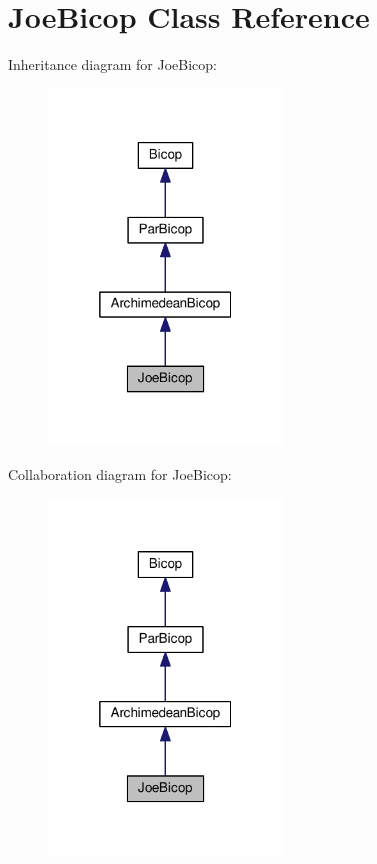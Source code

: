 \hypertarget{class_joe_bicop}{\section{Joe\+Bicop Class Reference}
\label{class_joe_bicop}
}


Inheritance diagram for Joe\+Bicop\+:
\nopagebreak
\begin{figure}[H]
\begin{center}
\leavevmode
\includegraphics[width=176pt]{class_joe_bicop__inherit__graph}
\end{center}
\end{figure}


Collaboration diagram for Joe\+Bicop\+:
\nopagebreak
\begin{figure}[H]
\begin{center}
\leavevmode
\includegraphics[width=176pt]{class_joe_bicop__coll__graph}
\end{center}
\end{figure}
